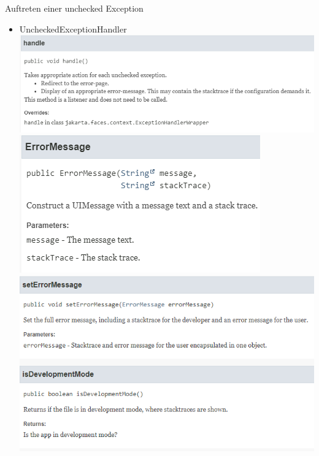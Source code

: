 \documentclass{beamer}
\begin{document}
\begin{frame}{Auftreten einer unchecked Exception}
\begin{itemize}
            \item UncheckedExceptionHandler
            \centering
            \includegraphics[height=1.1\textheight]{graphics/exc/doc_handle}
            \centering
            \includegraphics[height=1.1\textheight]{graphics/exc/doc_errormsg}
            \centering
            \includegraphics[height=1.1\textheight]{graphics/exc/doc_backing}

        \end{itemize}
    \end{frame}
\end{document}
